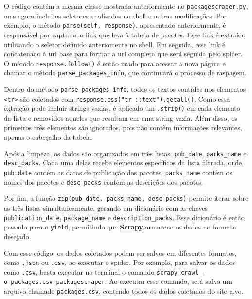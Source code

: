 \documentclass[
  12pt,
  a4paper,
]{scrreprt}
\begin{document}
O código contém a mesma classe mostrada anteriormente no
\texttt{packagescraper.py}, mas agora inclui os seletores analisados no
shell e outras modificações. Por exemplo, o método
\texttt{parse(self,\ response)}, apresentado anteriormente, é
responsável por capturar o link que leva à tabela de pacotes. Esse link
é extraído utilizando o seletor definido anteriomente no shell. Em
seguida, esse link é concatenado à url base para formar a url completa
que será seguida pelo spider. O método \texttt{response.follow()} é
então usado para acessar a nova página e chamar o método
\texttt{parse\_packages\_info}, que continuará o processo de raspagem.

\vspace{12pt}

Dentro do método \texttt{parse\_packages\_info}, todos os textos
contidos nos elementos \texttt{\textless{}tr\textgreater{}} são
coletados com \texttt{response.css("tr\ ::text").getall()}. Como essa
extração pode incluir strings vazias, é aplicado um \texttt{.strip()} em
cada elemento da lista e removidos aqueles que resultam em uma string
vazia. Além disso, os primeiros três elementos são ignorados, pois não
contêm informações relevantes, apenas o cabeçalho da tabela.

\vspace{12pt}

Após a limpeza, os dados são organizados em três listas:
\texttt{pub\_date}, \texttt{packs\_name} e \texttt{desc\_packs}. Cada
uma delas recebe elementos específicos da lista filtrada, onde,
\texttt{pub\_date} contém as datas de publicação dos pacotes,
\texttt{packs\_name} contém os nomes dos pacotes e \texttt{desc\_packs}
contém as descrições dos pacotes.

\vspace{12pt}

Por fim, a função \texttt{zip(pub\_date,\ packs\_name,\ desc\_packs)}
permite iterar sobre as três listas simultaneamente, gerando um
dicionário com as chaves \texttt{publication\_date},
\texttt{package\_name} e \texttt{description\_packs}. Esse dicionário é
então passado para o \texttt{yield}, permitindo que
\href{https://docs.scrapy.org/en/latest}{\textbf{Scrapy}} armazene os
dados no formato desejado.

\vspace{12pt}

Com esse código, os dados coletados podem ser salvos em diferentes
formatos, como \texttt{.json} ou \texttt{.csv}, ao executar o spider.
Por exemplo, para salvar os dados como \texttt{.csv}, basta executar no
terminal o comando
\texttt{scrapy\ crawl\ -o\ packages.csv\ packagescraper}. Ao executar
esse comando, será salvo um arquivo chamado \texttt{packages.csv},
contendo todos os dados coletados do site alvo.
\end{document}
